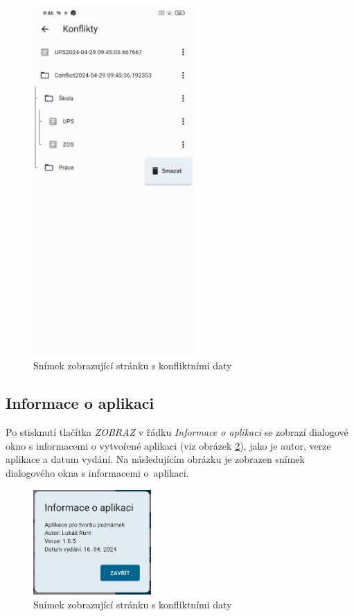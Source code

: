 \documentclass[czech, bc, kiv, he, iso690numb]{fasthesis}
\begin{document}
\begin{figure}[h!]
  \centering
  \includegraphics[width=0.55\textwidth]{img/BP-Runt/UserManual/Conflicts.jpg}
  \caption{Snímek zobrazující stránku s konfliktními daty}
  \label{fig:Conflicts}
\end{figure}

\subsection{Informace o aplikaci}

Po stisknutí tlačítka \textit{ZOBRAZ} v řádku \textit{Informace o aplikaci} se zobrazí dialogové okno s informacemi o vytvořené aplikaci (viz obrázek \ref{fig:appInformations}), jako je autor, verze aplikace a datum vydání. Na následujícím obrázku je zobrazen snímek dialogového okna s informacemi o~aplikaci.

\begin{figure}[h!]
  \centering
  \includegraphics[width=0.4\textwidth]{img/BP-Runt/UserManual/AppInformations.jpg}
  \caption{Snímek zobrazující stránku s konfliktními daty}
  \label{fig:appInformations}
\end{figure}
\end{document}
